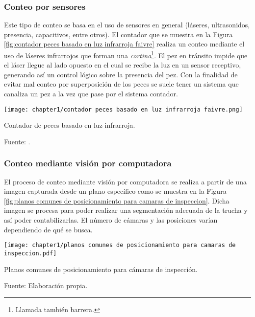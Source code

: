 \subsubsection{Conteo por sensores}

Este tipo de conteo se basa en el uso de sensores en general (láseres, ultrasonidos, presencia, capacitivos, entre otros).  El contador que se muestra en la Figura \ref{fig:contador peces basado en luz infrarroja faivre} realiza un conteo mediante el uso de láseres infrarrojos que forman una \textit{cortina}\footnote{Llamada también barrera.}. El pez en tránsito impide que el láser llegue al lado opuesto en el cual se recibe la luz en un sensor receptivo, generando así un control lógico sobre la presencia del pez. Con la finalidad de evitar mal conteo por superposición de los peces se suele tener un sistema que canaliza un pez a la vez que pase por el sistema contador.

\begin{myfigure}[H]
	\footnotesize\centering
	\texttt{[image: chapter1/contador peces basado en luz infrarroja faivre.png]}
	\caption{Contador de peces basado en luz infrarroja.}
	\begin{myflushcenter}
		Fuente: \citep{FAIVRE2013}.
	\end{myflushcenter}
	\label{fig:contador peces basado en luz infrarroja faivre}
\end{myfigure}

\subsubsection{Conteo mediante visión por computadora}

El proceso de conteo mediante visión por computadora se realiza a partir de una imagen capturada desde un plano específico como se muestra en la  Figura \ref{fig:planos comunes de posicionamiento para camaras de inspeccion}. Dicha imagen se procesa para poder realizar una segmentación adecuada de la trucha y así poder contabilizarlas. El número de cámaras y las posiciones varían dependiendo de qué se busca.

\begin{myfigure}[H]
	\footnotesize\centering
	\texttt{[image: chapter1/planos comunes de posicionamiento para camaras de inspeccion.pdf]}
	\caption{Planos comunes de posicionamiento para cámaras de inspección.}
	\begin{myflushcenter}
		Fuente: Elaboración propia.
	\end{myflushcenter}
	\label{fig:planos comunes de posicionamiento para camaras de inspeccion}
\end{myfigure}

